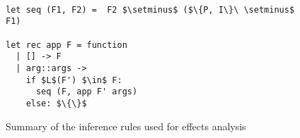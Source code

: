 \begin{figure}[H]
\vspace{0.2cm}
\begin{prooftree}
\end{prooftree} \hfill
\begin{prooftree}
\end{prooftree}\hfill \\

\vspace{0.2cm}
 \begin{prooftree}
\end{prooftree} 
\hfill\begin{prooftree}
\end{prooftree}\\

\vspace{0.2cm}
\begin{prooftree}
\end{prooftree}\hfill
\begin{prooftree}
\end{prooftree}\hfill 
\begin{prooftree}
\end{prooftree} \\

\begin{lstlisting}
let seq (F1, F2) =  F2 $\setminus$ ($\{P, I\}\ \setminus$ F1)

let rec app F = function
  | [] -> F
  | arg::args -> 
    if $L$(F') $\in$ F:
      seq (F, app F' args)
    else: $\{\}$
\end{lstlisting}

\caption{Summary of the inference rules used for effects analysis}
\label{fig:inferenceRules}
\end{figure}

